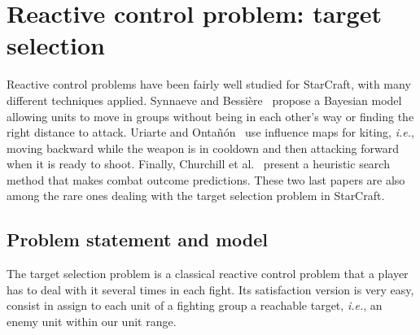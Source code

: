 \documentclass[journal]{IEEEtran}
\newcommand{\ghost}{\textsc{GHOST}\xspace}
\newcommand{\ie}{\textit{i.e.}}
\begin{document}

\section{Reactive control problem: target selection}\label{sec:target}

Reactive control problems have been fairly well studied for StarCraft,
with  many different  techniques  applied. Synnaeve  and
Bessi{\`e}re~\cite{SynnaeveB11-b}  propose a   Bayesian  model
allowing units  to move in  groups without  being in each  other's way or
finding the right distance to attack. Uriarte and Onta{\~n}{\'o}n~\cite{UriarteO12}
use influence  maps  for  kiting, \ie,  moving
backward while the weapon is in cooldown and then attacking  forward when it is ready to
shoot.  Finally, Churchill  et  al.~\cite{ChurchillSB12,  ChurchillB12}
present a heuristic search  method that makes combat outcome predictions.
These two  last papers are also  among the rare ones  dealing with the
target selection problem in StarCraft.

\subsection{Problem statement and model}

The target selection problem is  a classical reactive control problem that
a  player has  to  deal with  it  several times  in  each fight.   Its
satisfaction version  is very easy,  consist in assign  to each
unit of a fighting group a reachable target, \ie, an enemy unit within
our unit range.
\end{document}
